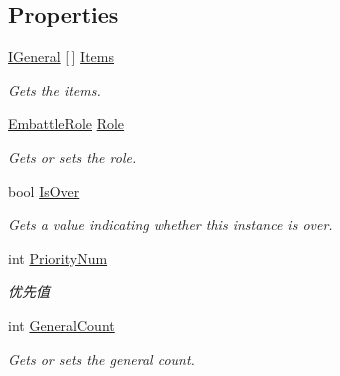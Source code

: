 \subsection*{Properties}
\begin{DoxyCompactItemize}
\item 
\mbox{\hyperlink{interface_t_net_1_1_model_1_1_i_general}{I\+General}} \mbox{[}$\,$\mbox{]} \mbox{\hyperlink{class_t_net_1_1_model_1_1_embattle_queue_a81b6720bb3516426c03be0e8451ca766}{Items}}
\begin{DoxyCompactList}\small\item\em Gets the items. \end{DoxyCompactList}\item 
\mbox{\hyperlink{namespace_t_net_1_1_model_a33d7abaa523c3472da9f2084152b79d3}{Embattle\+Role}} \mbox{\hyperlink{class_t_net_1_1_model_1_1_embattle_queue_a5a8c80a0311eaa84762f04b6fca79bfb}{Role}}
\begin{DoxyCompactList}\small\item\em Gets or sets the role. \end{DoxyCompactList}\item 
bool \mbox{\hyperlink{class_t_net_1_1_model_1_1_embattle_queue_a75ed024e044d9b4953b5a56b2eda30db}{Is\+Over}}
\begin{DoxyCompactList}\small\item\em Gets a value indicating whether this instance is over. \end{DoxyCompactList}\item 
int \mbox{\hyperlink{class_t_net_1_1_model_1_1_embattle_queue_aadb3b7fbd15df46adb2201fc9b006d65}{Priority\+Num}}
\begin{DoxyCompactList}\small\item\em 优先值 \end{DoxyCompactList}\item 
int \mbox{\hyperlink{class_t_net_1_1_model_1_1_embattle_queue_a6dc8368ec49a2508a2e0edb600015285}{General\+Count}}
\begin{DoxyCompactList}\small\item\em Gets or sets the general count. \end{DoxyCompactList}\item 

\end{DoxyCompactItemize}
